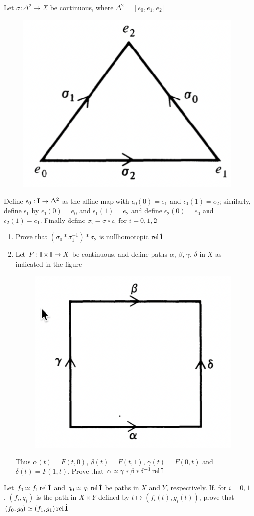 \documentclass[11pt]{article}
\DeclareMathOperator{\rel}{\text{rel}}
\begin{document}
\begin{exercise}
\label{ex3.4}
Let \(\sigma:\Delta^2\to X\) be continuous, where \(\Delta^2=[e_0,e_1,e_2]\)
\begin{figure}[htbp]
\centering
\includegraphics[width=.4\textwidth]{../images/AnIntroductionToAlgebraicTopology/6.png}
\label{}
\end{figure}

Define \(\epsilon_0:\operatorname{\textbf{I}}\to \Delta^2\) as the affine map with \(\epsilon_0(0)=e_1\) and \(\epsilon_0(1)=e_2\); similarly,
define \(\epsilon_1\) by \(\epsilon_1(0)=e_0\) and \(\epsilon_1(1)=e_2\) and define \(\epsilon_2(0)=e_0\) and \(\epsilon_2(1)=e_1\).
Finally define \(\sigma_i=\sigma\circ\epsilon_i\) for \(i=0,1,2\)
\begin{enumerate}
\item Prove that \((\sigma_0*\sigma^{-1}_1)*\sigma_2\) is nullhomotopic \(\rel\dbI\)
\item Let \(F:\operatorname{\textbf{I}}\times\operatorname{\textbf{I}}\to X\) be continuous, and define paths \(\alpha\), \(\beta\), \(\gamma\), \(\delta\) in \(X\) as indicated in the
figure
\begin{figure}[htbp]
\centering
\includegraphics[width=.4\textwidth]{../images/AnIntroductionToAlgebraicTopology/7.png}
\label{}
\end{figure}
Thus \(\alpha(t)=F(t,0)\), \(\beta(t)=F(t,1)\), \(\gamma(t)=F(0,t)\) and \(\delta(t)=F(1,t)\). Prove
that \(\alpha\simeq\gamma*\beta*\delta^{-1}\rel\dbI\)
\end{enumerate}
\end{exercise}

\begin{exercise}
\label{ex3.5}
Let \(f_0\simeq f_1\rel\dbI\) and \(g_0\simeq g_1\rel\dbI\) be paths in \(X\) and \(Y\), respectively. If,
for \(i=0,1\), \((f_i,g_i)\) is the path in \(X\times Y\) defined by \(t\mapsto(f_i(t),g_i(t))\), prove
that \((f_0,g_0)\simeq (f_1,g_1)\rel\dbI\)
\end{exercise}
\end{document}
